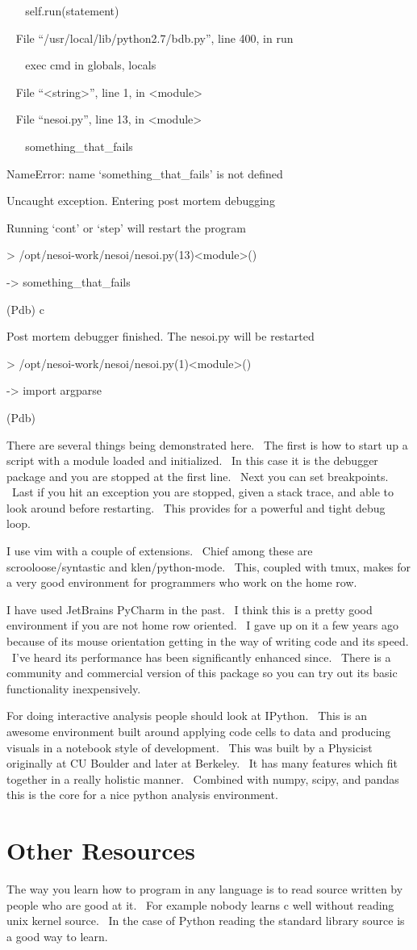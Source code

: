 \documentclass[]{article}
\begin{document}
~ ~ self.run(statement)

~ File ``/usr/local/lib/python2.7/bdb.py'', line 400, in run

~ ~ exec cmd in globals, locals

~ File ``\textless{}string\textgreater{}'', line 1, in
\textless{}module\textgreater{}

~ File ``nesoi.py'', line 13, in \textless{}module\textgreater{}

~ ~ something\_that\_fails

NameError: name `something\_that\_fails' is not defined

Uncaught exception. Entering post mortem debugging

Running `cont' or `step' will restart the program

\textgreater{}
/opt/nesoi-work/nesoi/nesoi.py(13)\textless{}module\textgreater{}()

-\textgreater{} something\_that\_fails

(Pdb) c

Post mortem debugger finished. The nesoi.py will be restarted

\textgreater{}
/opt/nesoi-work/nesoi/nesoi.py(1)\textless{}module\textgreater{}()

-\textgreater{} import argparse

(Pdb)

There are several things being demonstrated here. ~The first is how to
start up a script with a module loaded and initialized. ~In this case it
is the debugger package and you are stopped at the first line. ~Next you
can set breakpoints. ~Last if you hit an exception you are stopped,
given a stack trace, and able to look around before restarting. ~This
provides for a powerful and tight debug loop.

I use vim with a couple of extensions. ~Chief among these are
scrooloose/syntastic and klen/python-mode. ~This, coupled with tmux,
makes for a very good environment for programmers who work on the home
row.

I have used JetBrains PyCharm in the past. ~I think this is a pretty
good environment if you are not home row oriented. ~I gave up on it a
few years ago because of its mouse orientation getting in the way of
writing code and its speed. ~I've heard its performance has been
significantly enhanced since. ~There is a community and commercial
version of this package so you can try out its basic functionality
inexpensively.

For doing interactive analysis people should look at IPython. ~This is
an awesome environment built around applying code cells to data and
producing visuals in a notebook style of development. ~This was built by
a Physicist originally at CU Boulder and later at Berkeley. ~It has many
features which fit together in a really holistic manner. ~Combined with
numpy, scipy, and pandas this is the core for a nice python analysis
environment.

\section{Other Resources}

The way you learn how to program in any language is to read source
written by people who are good at it. ~For example nobody learns c well
without reading unix kernel source. ~In the case of Python reading the
standard library source is a good way to learn.
\end{document}
